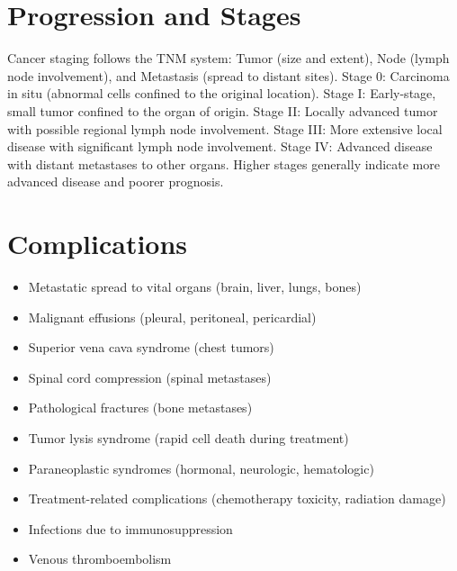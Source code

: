 \section{Progression and Stages}
Cancer staging follows the TNM system: Tumor (size and extent), Node (lymph node involvement), and Metastasis (spread to distant sites). Stage 0: Carcinoma in situ (abnormal cells confined to the original location). Stage I: Early-stage, small tumor confined to the organ of origin. Stage II: Locally advanced tumor with possible regional lymph node involvement. Stage III: More extensive local disease with significant lymph node involvement. Stage IV: Advanced disease with distant metastases to other organs. Higher stages generally indicate more advanced disease and poorer prognosis.
\section{Complications}
\begin{itemize}[noitemsep]
  \item Metastatic spread to vital organs (brain, liver, lungs, bones)
  \item Malignant effusions (pleural, peritoneal, pericardial)
  \item Superior vena cava syndrome (chest tumors)
  \item Spinal cord compression (spinal metastases)
  \item Pathological fractures (bone metastases)
  \item Tumor lysis syndrome (rapid cell death during treatment)
  \item Paraneoplastic syndromes (hormonal, neurologic, hematologic)
  \item Treatment-related complications (chemotherapy toxicity, radiation damage)
  \item Infections due to immunosuppression
  \item Venous thromboembolism
\end{itemize}
